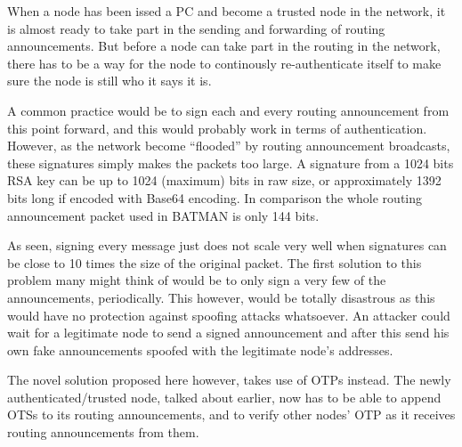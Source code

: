 

When a node has been issed a \ac{PC} and become a trusted node in the network,
it is almost ready to take part in the sending and forwarding of routing
announcements. But before a node can take part in the routing in the network,
there has to be a way for the node to continously re-authenticate itself to make
sure the node is still who it says it is.

A common practice would be to sign each and every routing announcement from this
point forward, and this would probably work in terms of authentication. However,
as the network become ``flooded'' by routing announcement broadcasts, these
signatures simply makes the packets too large. A signature from a 1024 bits RSA
key can be up to 1024 (maximum) bits in raw size, or approximately 1392 bits
long if encoded with Base64 encoding. In comparison the whole routing announcement packet used
in BATMAN is only 144 bits.

As seen, signing every message just does not scale very well when signatures can
be close to 10 times the size of the original packet. The first solution to this
problem many might think of would be to only sign a very few of the
announcements, periodically. This however, would be totally disastrous as this
would have no protection against spoofing attacks whatsoever. An attacker could
wait for a legitimate node to send a signed announcement and after this send his
own fake announcements spoofed with the legitimate node's addresses.

The novel solution proposed here however, takes use of \acp{OTP} instead. The
newly authenticated/trusted node, talked about earlier, now has to be able to
append \acp{OTS} to its routing announcements, and to verify other nodes'
\ac{OTP} as it receives routing announcements from them.

